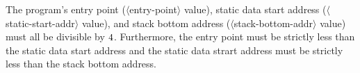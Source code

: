 \documentclass[11pt,letterpaper]{article}
\renewcommand{\nonterm}[1]{\mbox{$\langle$\textrm{#1}$\rangle$}}
\begin{document}
The program's entry point (\nonterm{entry-point} value),
static data start address (\nonterm{static-start-addr} value),
and stack bottom address (\nonterm{stack-bottom-addr} value)
must all be divisible by $4$.
Furthermore, the entry point must be strictly less than the static
data start address and the static data strart address must be strictly
less than the stack bottom address.



\end{document}
